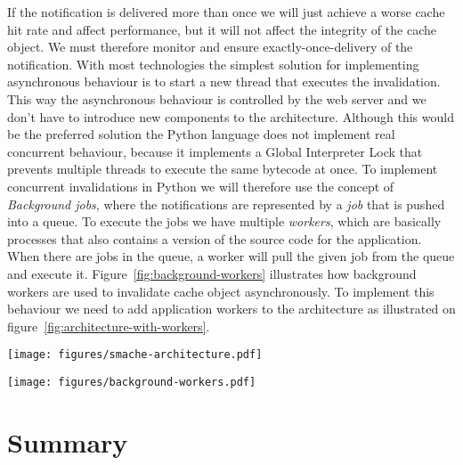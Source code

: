 If the notification is delivered more than once we will just achieve a worse cache hit rate and affect performance, but it will not affect the integrity of the cache object. We must therefore monitor and ensure exactly-once-delivery of the notification.
With most technologies the simplest solution for implementing asynchronous behaviour is to start a new thread that executes the invalidation. This way the asynchronous behaviour is controlled by the web server and we don't have to introduce new components to the architecture. Although this would be the preferred solution the Python language does not implement real concurrent behaviour, because it implements a Global Interpreter Lock that prevents multiple threads to execute the same bytecode at once.
To implement concurrent invalidations in Python we will therefore use the concept of \emph{Background jobs}, where the notifications are represented by a \emph{job} that is pushed into a queue. To execute the jobs we have multiple \emph{workers}, which are basically processes that also contains a version of the source code for the application. When there are jobs in the queue, a worker will pull the given job from the queue and execute it. Figure~\ref{fig:background-workers} illustrates how background workers are used to invalidate cache object asynchronously. To implement this behaviour we need to add application workers to the architecture as illustrated on figure~\ref{fig:architecture-with-workers}.

\begin{figure*}[ht!]
  \centering
  \texttt{[image: figures/smache-architecture.pdf]}
  \caption{The architecture required by a web application that uses Smache with automatic invalidation.}
  \label{fig:architecture-with-workers}
\end{figure*}

\begin{figure*}[ht!]
  \centering
  \texttt{[image: figures/background-workers.pdf]}
  \caption{How background workers are used do perform invalidation asynchronously.}
  \label{fig:background-workers}
\end{figure*}



\section{Summary}
\label{sec:invalidation-summary}


